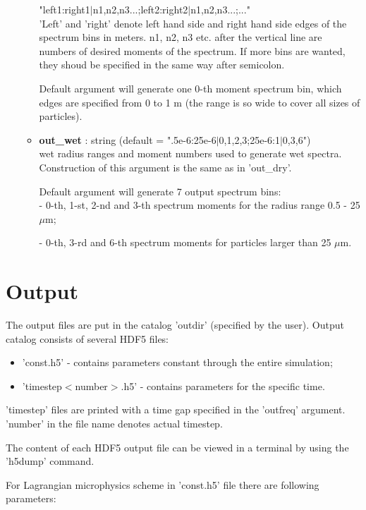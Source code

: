 \documentclass[11pt]{article}
\begin{document}
\begin{itemize}
\begin{itemize}[label=$\bullet$]
"left1:right1$|$n1,n2,n3...;left2:right2$|$n1,n2,n3...;..."\\

'Left' and 'right' denote left hand side and right hand side edges of the spectrum bins in meters. n1, n2, n3 etc. after the vertical line are numbers of desired moments of the spectrum. If more bins are wanted, they shoud be specified in the same way after semicolon.

Default argument will generate one 0-th moment spectrum bin, which edges are specified from 0 to 1 m (the range is so wide to cover all sizes of particles).

\item \textbf{out\_wet} : string (default = ".5e-6:25e-6$|$0,1,2,3;25e-6:1$|$0,3,6")\\
wet radius ranges and moment numbers used to generate wet spectra. Construction of this argument is the same as in 'out\_dry'.

Default argument will generate 7 output spectrum bins:\\
- 0-th, 1-st, 2-nd and 3-th spectrum moments for the radius range 0.5 - 25 $\mu$m;

- 0-th, 3-rd and 6-th spectrum moments for particles larger than 25 $\mu$m.

\end{itemize}

\end{itemize}

\section{Output}

The output files are put in the catalog 'outdir' (specified by the user). Output catalog consists of several HDF5 files:

\begin{itemize}
\item 'const.h5' - contains parameters constant through the entire simulation;
\item 'timestep$<$number$>$.h5' - contains parameters for the specific time.
\end{itemize}

'timestep' files are printed with a time gap specified in the 'outfreq' argument. 'number' in the file name denotes actual timestep.

The content of each HDF5 output file can be viewed in a terminal by using the 'h5dump' command.

For Lagrangian microphysics scheme in 'const.h5' file there are following parameters:
\end{document}
